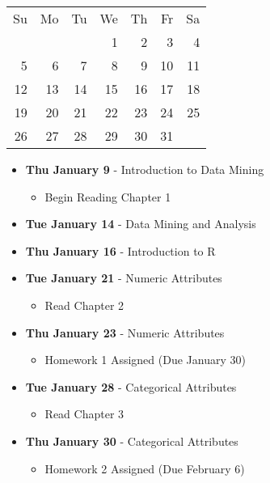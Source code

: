 \begin{tabular}{rrrrrrr}
Su & Mo & Tu & We & Th & Fr & Sa\\
   &    &    &  1 &  2 &  3 &  4\\ 
 5 &  6 &  7 &  8 &  9 & 10 & 11\\ 
12 & 13 & 14 & 15 & 16 & 17 & 18\\ 
19 & 20 & 21 & 22 & 23 & 24 & 25\\ 
26 & 27 & 28 & 29 & 30 & 31 &\\
\end{tabular}
\begin{itemize}
\item\textbf{Thu January  9} - Introduction  to Data Mining
    \begin{itemize}
        \item Begin Reading Chapter 1
    \end{itemize}
\item\textbf{Tue January 14} - Data Mining and Analysis
\item\textbf{Thu January 16} - Introduction to R
\item\textbf{Tue January 21} - Numeric Attributes
    \begin{itemize}
        \item Read Chapter 2
    \end{itemize}
\item\textbf{Thu January 23} - Numeric Attributes
    \begin{itemize}
        \item Homework 1 Assigned (Due January 30)
    \end{itemize}
\item\textbf{Tue January 28} - Categorical Attributes
    \begin{itemize}
        \item Read Chapter 3
    \end{itemize}
\item\textbf{Thu January 30} - Categorical Attributes
    \begin{itemize}
        \item Homework 2 Assigned (Due February 6)
    \end{itemize}
\end{itemize}
\hrulefill

